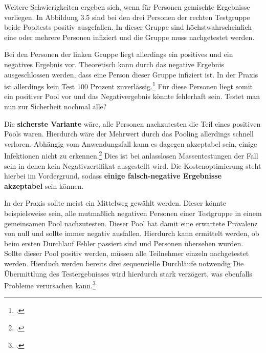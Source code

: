 Weitere Schwierigkeiten ergeben sich, wenn für Personen gemischte Ergebnisse vorliegen.
In Abbildung 3.5 sind bei den drei Personen der rechten Testgruppe beide Pooltests positiv ausgefallen.
In dieser Gruppe sind höchstwahrscheinlich eine oder mehrere Personen infiziert und die Gruppe muss nachgetestet werden.

Bei den Personen der linken Gruppe liegt allerdings ein positives und ein negatives Ergebnis vor.
Theoretisch kann durch das negative Ergebnis ausgeschlossen werden, dass eine Person dieser Gruppe infiziert ist.
In der Praxis ist allerdings kein Test 100 Prozent zuverlässig.\footcite{verwilt_evaluation_2021}
Für diese Personen liegt somit ein positiver Pool vor und das Negativergebnis könnte fehlerhaft sein.
Testet man nun zur Sicherheit nochmal alle?

Die \textbf{sicherste Variante} wäre, alle Personen nachzutesten die Teil eines positiven Pools waren.
Hierdurch wäre der Mehrwert durch das Pooling allerdings schnell verloren.
Abhängig vom Anwendungsfall kann es dagegen akzeptabel sein, einige Infektionen nicht zu erkennen.\footcite{weishampel_orasure_2022}
Dies ist bei anlasslosen Massentestungen der Fall sein in denen kein Negativzertifikat ausgestellt wird.
Die Kostenoptimierung steht hierbei im Vordergrund, sodass \textbf{einige falsch-negative Ergebnisse akzeptabel} sein können. 

In der Praxis sollte meist ein Mittelweg gewählt werden.
Dieser könnte beispielsweise sein, alle mutmaßlich negativen Personen einer Testgruppe in einem gemeinsamen Pool nachzutesten.
Dieser Pool hat damit eine erwartete Prävalenz von null und sollte immer negativ ausfallen.
Hierdurch kann ermittelt werden, ob beim ersten Durchlauf Fehler passiert sind und Personen übersehen wurden.
Sollte dieser Pool positiv werden, müssen alle Teilnehmer einzeln nachgetestet werden.
Hierduch werden bereits drei sequenzielle Durchläufe notwendig
Die Übermittlung des Testergebnisses wird hierdurch stark verzögert, was ebenfalls Probleme verursachen kann.\footcite{viehweger_increased_2020}

